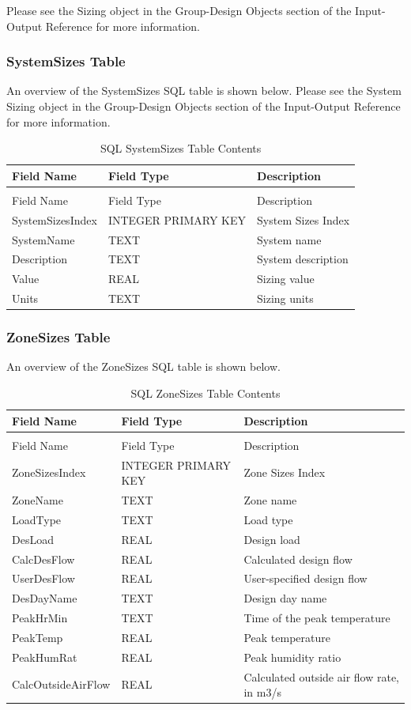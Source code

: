 Please see the Sizing object in the Group-Design Objects section of the Input-Output Reference for more information.

\subsubsection{SystemSizes Table}

An overview of the SystemSizes SQL table is shown below. Please see the System Sizing object in the Group-Design Objects section of the Input-Output Reference for more information.

\begin{longtable}[c]{@{}lll@{}}
\caption{SQL SystemSizes Table Contents \label{table:table-31.-sql-systemsizes-table-contents}} \tabularnewline
\toprule
Field Name & Field Type & Description \tabularnewline
\midrule
\endfirsthead

\caption[]{SQL SystemSizes Table Contents} \tabularnewline
\toprule
Field Name & Field Type & Description \tabularnewline
\midrule
\endhead

SystemSizes\-Index & INTEGER PRIMARY KEY & System Sizes Index \tabularnewline
SystemName & TEXT & System name \tabularnewline
Description & TEXT & System description \tabularnewline
Value & REAL & Sizing value \tabularnewline
Units & TEXT & Sizing units \tabularnewline
\bottomrule
\end{longtable}

\subsubsection{ZoneSizes Table}

An overview of the ZoneSizes SQL table is shown below.

\begin{longtable}[c]{>{\raggedright}p{1.5in}>{\raggedright}p{1.5in}>{\raggedright}p{3in}}
\caption{SQL ZoneSizes Table Contents \label{table:table-32.-sql-zonesizes-table-contents}} \tabularnewline
\toprule
Field Name & Field Type & Description \tabularnewline
\midrule
\endfirsthead

\caption[]{SQL ZoneSizes Table Contents} \tabularnewline
\toprule
Field Name & Field Type & Description \tabularnewline
\midrule
\endhead

ZoneSizes\-Index & INTEGER PRIMARY KEY & Zone Sizes Index \tabularnewline
ZoneName & TEXT & Zone name \tabularnewline
LoadType & TEXT & Load type \tabularnewline
DesLoad & REAL & Design load \tabularnewline
CalcDesFlow & REAL & Calculated design flow \tabularnewline
UserDesFlow & REAL & User-specified design flow \tabularnewline
DesDayName & TEXT & Design day name \tabularnewline
PeakHrMin & TEXT & Time of the peak temperature \tabularnewline
PeakTemp & REAL & Peak temperature \tabularnewline
PeakHumRat & REAL & Peak humidity ratio \tabularnewline
CalcOutside\-Air\-Flow & REAL & Calculated outside air flow rate, in m3/s \tabularnewline
\bottomrule
\end{longtable}

